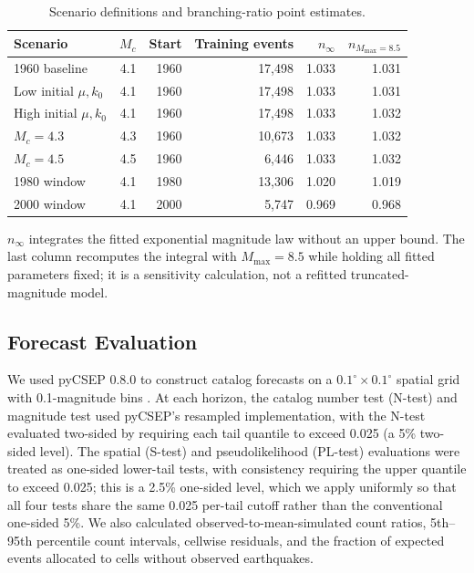 \documentclass[12pt]{article}
\begin{document}
\begin{table}[ht]
\caption{Scenario definitions and branching-ratio point estimates.}
\label{tab:scenarios}
\centering
\begin{tabular}{lrrrrr}
\toprule
Scenario & $M_c$ & Start & Training events & $n_\infty$ & $n_{M_{\max}=8.5}$\\
\midrule
1960 baseline & 4.1 & 1960 & 17,498 & 1.033 & 1.031\\
Low initial $\mu,k_0$ & 4.1 & 1960 & 17,498 & 1.033 & 1.031\\
High initial $\mu,k_0$ & 4.1 & 1960 & 17,498 & 1.033 & 1.032\\
$M_c=4.3$ & 4.3 & 1960 & 10,673 & 1.033 & 1.032\\
$M_c=4.5$ & 4.5 & 1960 & 6,446 & 1.033 & 1.032\\
1980 window & 4.1 & 1980 & 13,306 & 1.020 & 1.019\\
2000 window & 4.1 & 2000 & 5,747 & 0.969 & 0.968\\
\bottomrule
\end{tabular}

\noindent $n_\infty$ integrates the fitted exponential magnitude law without
an upper bound. The last column recomputes the integral with
$M_{\max}=8.5$ while holding all fitted parameters fixed; it is a sensitivity
calculation, not a refitted truncated-magnitude model.
\end{table}

\subsection*{Forecast Evaluation}

We used pyCSEP 0.8.0 to construct catalog forecasts on a
$0.1^\circ\times0.1^\circ$ spatial grid with 0.1-magnitude bins
\citep{Savran2022}. At each horizon, the catalog number test (N-test) and
magnitude test used pyCSEP's resampled implementation, with the N-test evaluated
two-sided by requiring each tail quantile to exceed 0.025 (a 5\% two-sided
level). The spatial (S-test) and pseudolikelihood (PL-test) evaluations were
treated as one-sided lower-tail tests, with consistency requiring the upper
quantile to exceed 0.025; this is a 2.5\% one-sided level, which we apply
uniformly so that all four tests share the same 0.025 per-tail cutoff rather than
the conventional one-sided 5\%. We also calculated
observed-to-mean-simulated count ratios, 5th--95th percentile count intervals,
cellwise residuals, and the fraction of expected events allocated to cells
without observed earthquakes.
\end{document}
